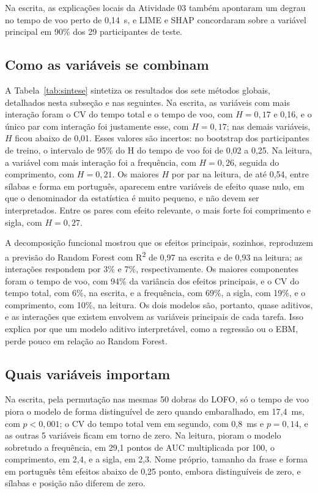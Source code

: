 \documentclass[conference]{IEEEtran}
\newcommand{\RF}{Random Forest}
\newcommand{\Rdois}{R\textsuperscript{2}}
\begin{document}
Na escrita, as explicações locais da Atividade 03 também apontaram um degrau no
tempo de voo perto de 0,14~s, e LIME e SHAP concordaram sobre a variável
principal em 90\% dos 29 participantes de teste.

\subsection{Como as variáveis se combinam}

A Tabela~\ref{tab:sintese} sintetiza os resultados dos sete métodos globais,
detalhados nesta subseção e nas seguintes. Na escrita, as variáveis com mais
interação foram o CV do tempo total e o tempo de voo, com $H = 0,17$ e 0,16, e
o único par com interação foi justamente esse, com $H = 0,17$; nas demais
variáveis, $H$ ficou abaixo de 0,01. Esses valores são incertos: no bootstrap
dos participantes de treino, o intervalo de 95\% do H do tempo de voo foi de
0,02 a 0,25. Na leitura, a variável com mais interação
foi a frequência, com $H = 0,26$, seguida do comprimento, com $H = 0,21$. Os
maiores $H$ por par na leitura, de até 0,54, entre sílabas e forma em
português, aparecem entre variáveis de efeito quase nulo, em que o denominador
da estatística é muito pequeno, e não devem ser interpretados. Entre os pares
com efeito relevante, o mais forte foi comprimento e sigla, com $H = 0,27$.

A decomposição funcional mostrou que os efeitos principais, sozinhos,
reproduzem a previsão do \RF{} com \Rdois{} de 0,97 na escrita e de 0,93 na
leitura; as interações respondem por 3\% e 7\%, respectivamente. Os maiores
componentes foram o tempo de voo, com 94\% da variância dos efeitos principais,
e o CV do tempo total, com 6\%, na escrita, e a frequência, com 69\%, a sigla,
com 19\%, e o comprimento, com 10\%, na leitura. Os dois modelos são, portanto,
quase aditivos, e as interações que existem envolvem as variáveis principais de
cada tarefa. Isso explica por que um modelo aditivo interpretável, como a
regressão ou o EBM, perde pouco em relação ao \RF{}.

\subsection{Quais variáveis importam}
\label{sec:importancia}

Na escrita, pela permutação nas mesmas 50 dobras do LOFO, só o tempo de voo
piora o modelo de forma distinguível de zero quando embaralhado, em 17,4~ms,
com $p < 0,001$; o CV do tempo total vem em segundo, com 0,8~ms e $p = 0,14$, e
as outras 5 variáveis ficam em torno de zero. Na leitura, pioram o modelo
sobretudo a frequência, em 29,1 pontos de AUC multiplicada por 100, o
comprimento, em 2,4, e a sigla, em 2,3. Nome próprio, tamanho da frase e forma
em português têm efeitos abaixo de 0,25 ponto, embora distinguíveis de zero, e
sílabas e posição não diferem de zero.
\end{document}
